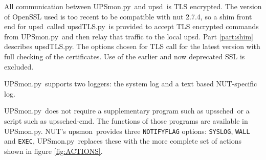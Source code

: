 \documentclass[12pt]{article}
\newcommand{\upsd}{\mbox{\textcolor{UPSDCOLOUR}{upsd}}}
\newcommand{\upsmon}{\mbox{\textcolor{MONCOLOUR}{upsmon}}}
\newcommand{\upssched}{\mbox{\textcolor{SCHEDCOLOUR}{upssched}}}
\newcommand{\upsschedcmd}{\mbox{\textcolor{CMDCOLOUR}{upssched-cmd}}}
\newcommand{\upsdTLS}{\mbox{\textcolor{UPSDCOLOUR}{upsdTLS.py}}}
\newcommand{\UPSmon}{\mbox{\textcolor{UPSMONCOLOUR}{UPSmon.py}}}
\newcommand{\li}{\item}                 %
\begin{document}
\li All communication between \UPSmon\ and \upsd\ is TLS encrypted. The
version of OpenSSL used is too recent to be compatible with nut 2.7.4, so a
shim front end for \upsd\ called \upsdTLS\ is provided to accept TLS encrypted
commands from \UPSmon\ and then relay that traffic to the local \upsd.  Part
\ref{part:shim} describes \upsdTLS.  The options chosen for TLS call for the
latest version with full checking of the certificates.  Use of the earlier and
now deprecated SSL is excluded.

\li \UPSmon\ supports two loggers: the system log and a text based
NUT-specific log.

\li \UPSmon\ does not require a supplementary program such as \upssched\ or a
script such as \upsschedcmd.  The functions of those programs are available in
\UPSmon.  NUT's \upsmon\ provides three \texttt{NOTIFYFLAG} options:
\texttt{SYSLOG}, \texttt{WALL} and \texttt{EXEC}, \UPSmon\ replaces these with
the more complete set of actions shown in figure \ref{fig:ACTIONS}.
\end{document}
